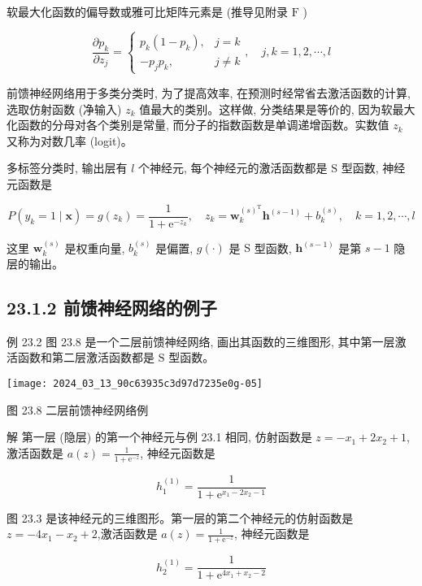 \documentclass[10pt]{article}
\begin{document}
\begin{CJK*}{UTF8}{bsmi}
软最大化函数的偏导数或雅可比矩阵元素是 (推导见附录 $\mathrm{F}$ )

\[
\frac{\partial p_{k}}{\partial z_{j}}=\left\{\begin{array}{ll}
p_{k}\left(1-p_{k}\right), & j=k  \tag{23.24}\\
-p_{j} p_{k}, & j \neq k
\end{array}, \quad j, k=1,2, \cdots, l\right.
\]

前馈神经网络用于多类分类时, 为了提高效率, 在预测时经常省去激活函数的计算, 选取仿射函数 (净输入) $z_{k}$ 值最大的类别。这样做, 分类结果是等价的, 因为软最大化函数的分母对各个类别是常量, 而分子的指数函数是单调递增函数。实数值 $z_{k}$ 又称为对数几率 (logit)。

多标签分类时, 输出层有 $l$ 个神经元, 每个神经元的激活函数都是 $\mathrm{S}$ 型函数, 神经元函数是


\begin{equation*}
P\left(y_{k}=1 \mid \boldsymbol{x}\right)=g\left(z_{k}\right)=\frac{1}{1+\mathrm{e}^{-z_{k}}}, \quad z_{k}=\boldsymbol{w}_{k}^{(s)^{\mathrm{T}}} \boldsymbol{h}^{(s-1)}+b_{k}^{(s)}, \quad k=1,2, \cdots, l \tag{23.25}
\end{equation*}


这里 $\boldsymbol{w}_{k}^{(s)}$ 是权重向量, $b_{k}^{(s)}$ 是偏置, $g(\cdot)$ 是 $\mathrm{S}$ 型函数, $\boldsymbol{h}^{(s-1)}$ 是第 $s-1$ 隐层的输出。

\subsection*{23.1.2 前馈神经网络的例子}
例 23.2 图 23.8 是一个二层前馈神经网络, 画出其函数的三维图形, 其中第一层激活函数和第二层激活函数都是 $\mathrm{S}$ 型函数。

\begin{center}
\texttt{[image: 2024\_03\_13\_90c63935c3d97d7235e0g-05]}
\end{center}

图 23.8 二层前馈神经网络例

解 第一层 (隐层) 的第一个神经元与例 23.1 相同, 仿射函数是 $z=-x_{1}+2 x_{2}+1$, 激活函数是 $a(z)=\frac{1}{1+\mathrm{e}^{-z}}$, 神经元函数是

$$
h_{1}^{(1)}=\frac{1}{1+\mathrm{e}^{x_{1}-2 x_{2}-1}}
$$

图 23.3 是该神经元的三维图形。第一层的第二个神经元的仿射函数是 $z=-4 x_{1}-x_{2}+2$,激活函数是 $a(z)=\frac{1}{1+\mathrm{e}^{-z}}$, 神经元函数是

$$
h_{2}^{(1)}=\frac{1}{1+\mathrm{e}^{4 x_{1}+x_{2}-2}}
$$


\end{CJK*}
\end{document}
